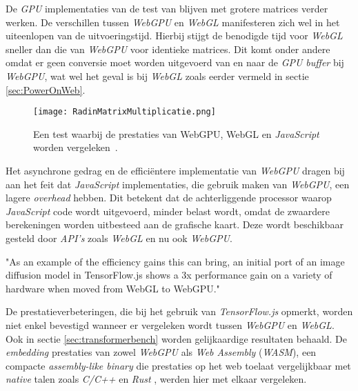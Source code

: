 \bigbreak{}

De \textit{GPU} implementaties van de test van \textcite{Radin2021} blijven met grotere matrices verder werken. De verschillen tussen \textit{WebGPU} en \textit{WebGL} manifesteren zich wel in het uiteenlopen van de uitvoeringstijd. Hierbij stijgt de benodigde tijd voor \textit{WebGL} sneller dan die van \textit{WebGPU} voor identieke matrices. Dit komt onder andere omdat er geen conversie moet worden uitgevoerd van en naar de \textit{GPU buffer} bij \textit{WebGPU}, wat wel het geval is bij \textit{WebGL} zoals eerder vermeld in sectie \ref{sec:PowerOnWeb}. 

\break{}

\begin{figure}
    \texttt{[image: RadinMatrixMultiplicatie.png]}
    \caption[Matrixvermenigvuldiging test~\autocite{Radin2021}]{Een test waarbij de prestaties van WebGPU, WebGL en \textit{JavaScript} worden vergeleken~\autocite{Radin2021}.}
    \label{fig:Matrix Multiplication By Radin}
\end{figure}

Het asynchrone gedrag en de efficiëntere implementatie van \textit{WebGPU} dragen bij aan het feit dat \textit{JavaScript} implementaties, die gebruik maken van \textit{WebGPU}, een lagere \textit{overhead} hebben. Dit betekent dat de achterliggende processor waarop \textit{JavaScript} code wordt uitgevoerd, minder  belast wordt, omdat de zwaardere berekeningen worden uitbesteed aan de grafische kaart. Deze wordt beschikbaar gesteld door \textit{API's} zoals \textit{WebGL} en nu ook \textit{WebGPU}.

\begin{displayquote}
    "As an example of the efficiency gains this can bring, an initial port of an image diffusion model in TensorFlow.js shows a 3x performance gain on a variety of hardware when moved from WebGL to WebGPU."
\end{displayquote}

De prestatieverbeteringen, die \textcite{Wallez2023} bij het gebruik van \textit{TensorFlow.js} opmerkt, worden niet enkel bevestigd wanneer er vergeleken wordt tussen \textit{WebGPU} en \textit{WebGL}. Ook in sectie \ref{sec:transformerbench} worden gelijkaardige resultaten behaald. De \textit{embedding} prestaties van zowel \textit{WebGPU} als \textit{Web Assembly} (\textit{WASM}), een compacte \textit{assembly-like binary} die prestaties op het web toelaat vergelijkbaar met \textit{native} talen zoals \textit{C/C++} en \textit{Rust} \autocite{Steiner2023}, werden hier met elkaar vergeleken.

